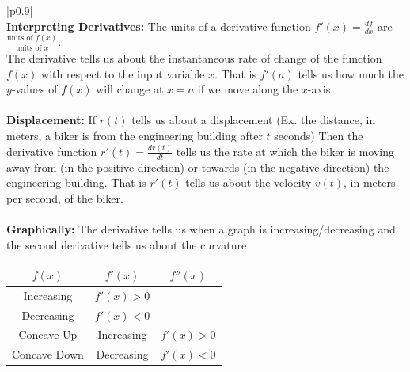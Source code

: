 \documentclass[12pt]{report}
\newenvironment{boxe2}
    {\begin{center}
    \begin{tabular}{|p{0.9\textwidth}|}
    \hline\\
    }
    { 
    \\\hline
    \end{tabular} 
    \end{center}
    }
\begin{document}
\begin{boxe2}
\textbf{Interpreting Derivatives: } The units of a derivative function $f'(x)=\frac{df}{dx}$ are $\frac{\text{units of }f(x)}{\text{units of }x}$.\\
The derivative tells us about the instantaneous rate of change of the function $f(x)$ with respect to the input variable $x$.
That is $f'(a)$ tells us how much the $y$-values of $f(x)$ will change at $x=a$ if we move along the $x$-axis.\\\\


\textbf{Displacement: } If $r(t)$ tells us about a displacement 
(Ex. the distance, in meters, a biker is from the engineering building after $t$ seconds) 
Then the derivative function $r'(t)=\frac{dr(t)}{dt}$ tells us the rate at which the biker is moving away from (in the positive direction) or towards (in the negative direction) the engineering building.
That is $r'(t)$ tells us about the velocity $v(t)$, in meters per second, of the biker.\\\\
\textbf{Graphically:} The derivative tells us when a graph is increasing/decreasing and the second derivative tells us about the curvature
\begin{center}
\begin{tabular}{c|c|c}
    $f(x)$ & $f'(x)$ & $f''(x)$\\
    \hline
    Increasing & $f'(x)>0$ & \\
    Decreasing & $f'(x)<0$ & \\
    \hline
    Concave Up & Increasing & $f'(x)>0$\\
    Concave Down & Decreasing & $f'(x)<0$ \\

\end{tabular}
\end{center}
\end{boxe2}
\end{document}
